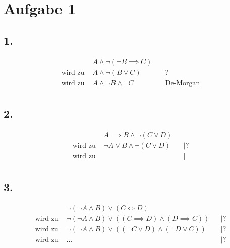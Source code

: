 \documentclass[a4paper,11pt]{article}
\begin{document}
\raggedright %

\section*{Aufgabe 1}
\subsection*{1.}
\begin{align*}
& A \wedge \neg (\neg B \implies C) & \\
\text{wird zu } & A \wedge \neg (B \vee C) && \big| \text{?} \\
\text{wird zu } & A \wedge \neg B \wedge \neg C && \big| \text{De-Morgan} \\
\end{align*}

\subsection*{2.}
\begin{align*}
& A \implies B \wedge \neg (C \vee D) & \\
\text{wird zu } & \neg A \vee B \wedge \neg (C \vee D) && \big| \text{?} \\
\text{wird zu } &  && \big| \text{} \\
\end{align*}

\subsection*{3.}
\begin{align*}
& \neg(\neg A \wedge B) \vee (C \iff D) & \\
\text{wird zu } & \neg(\neg A \wedge B) \vee ((C \implies D) \wedge (D \implies C)) && \big| \text{?} \\
\text{wird zu } & \neg(\neg A \wedge B) \vee ((\neg C \vee D) \wedge (\neg D \vee C)) && \big| \text{?} \\
\text{wird zu } & ... && \big| \text{?} \\
\end{align*}
\end{document}
